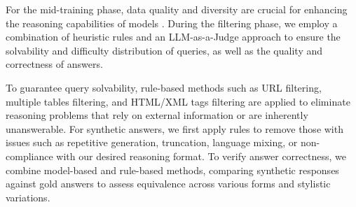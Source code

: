 






For the mid-training phase,
data quality and diversity are crucial for enhancing the reasoning capabilities of models \citep{xi2025samplemix}. During the filtering phase, we employ a combination of heuristic rules and an LLM-as-a-Judge approach to ensure the solvability and difficulty distribution of queries, as well as the quality and correctness of answers.

To guarantee query solvability, rule-based methods such as URL filtering, multiple tables filtering, and HTML/XML tags filtering are applied to eliminate reasoning problems that rely on external information or are inherently unanswerable. For synthetic answers, we first apply rules to remove those with issues such as repetitive generation, truncation, language mixing, or non-compliance with our desired reasoning format.
To verify answer correctness, we combine model-based and rule-based methods, comparing synthetic responses against gold answers to assess equivalence across various forms and stylistic variations. 


